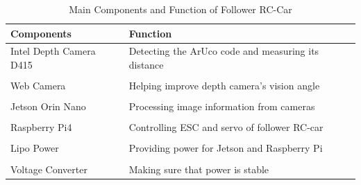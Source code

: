 \documentclass[journal,transmag]{IEEEtran}
\begin{document}
\begin{table}[h]
\centering
\caption{Main Components and Function of Follower RC-Car}
\label{tab:Main Components and Function of Follower RC-Car}
\begin{tabularx}{\columnwidth}{l X}
\hline
\textbf{Components} & \textbf{Function} \\
\hline
Intel Depth Camera D415 & Detecting the ArUco code and measuring its distance \\
\\
Web Camera & Helping improve depth camera's vision angle \\
\\
Jetson Orin Nano & Processing image information from cameras \\
\\
Raspberry Pi4 & Controlling ESC and servo of follower RC-car \\
\\
Lipo Power & Providing power for Jetson and Raspberry Pi \\
\\
Voltage Converter & Making sure that power is stable \\
\hline
\end{tabularx}
\end{table}





\end{document}
